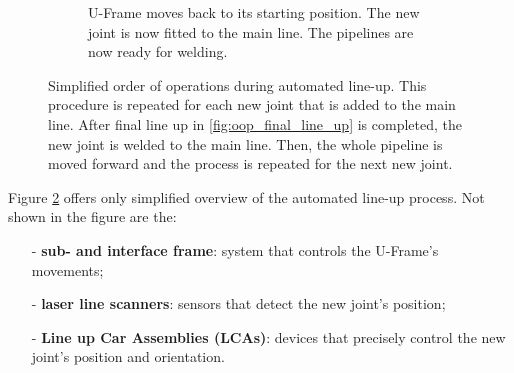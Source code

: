 \begin{figure}[H]
\begin{subfigure}{0.7\textwidth}
        \caption{U-Frame moves back to its starting position. The new joint is now fitted to the main line. The pipelines
            are now ready for welding.}
        \label{fig:oop_end}
    \end{subfigure}
    \caption{Simplified order of operations during automated line-up. This procedure is repeated for
        each new joint that is added to the main line. After final line up in \ref{fig:oop_final_line_up} is completed, the new joint
        is welded to the main line. Then, the whole pipeline is moved forward and the process is repeated for the next new joint.}
    \label{fig:oop_lua}
\end{figure}

Figure \ref{fig:oop_lua} offers only simplified overview of the automated line-up process.
Not shown in the figure are the:
\begin{enumerate}
    \item [-] \textbf{sub- and interface frame}: system that controls the U-Frame's movements;
    \item [-] \textbf{laser line scanners}: sensors that detect the new joint's position;
    \item [-] \textbf{Line up Car Assemblies (LCAs)}: devices that precisely control the new joint's position and orientation.
\end{enumerate}

\newpage
